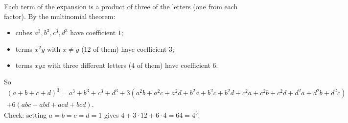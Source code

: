 Each term of the expansion is a product of three of the letters (one from each factor). By the multinomial theorem:
\begin{itemize}
\item cubes $a^3,b^3,c^3,d^3$ have coefficient $1$;
\item terms $x^2y$ with $x\ne y$ ($12$ of them) have coefficient $3$;
\item terms $xyz$ with three different letters ($4$ of them) have coefficient $6$.
\end{itemize}
So
\begin{multline*}
(a+b+c+d)^3=a^3+b^3+c^3+d^3+3\left(a^2b+a^2c+a^2d+b^2a+b^2c+b^2d+c^2a+c^2b+c^2d+d^2a+d^2b+d^2c\right)\\+6(abc+abd+acd+bcd).
\end{multline*}
Check: setting $a=b=c=d=1$ gives $4+3\cdot12+6\cdot4=64=4^3$.

